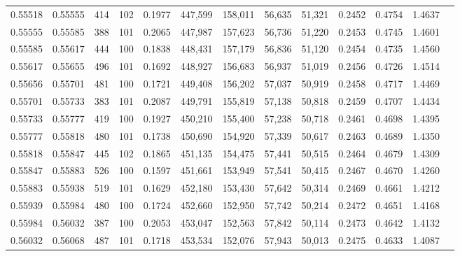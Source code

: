 \begin{tabular}{rrrrrrrrrrrrr}
0.55518 & 0.55555 &   414 & 102 &                                     0.1977 & 447,599 & 158,011 &  56,635 &  51,321 & 0.2452 & 0.4754 & 1.4637 \\
0.55555 & 0.55585 &   388 & 101 &                                     0.2065 & 447,987 & 157,623 &  56,736 &  51,220 & 0.2453 & 0.4745 & 1.4601 \\
0.55585 & 0.55617 &   444 & 100 &                                     0.1838 & 448,431 & 157,179 &  56,836 &  51,120 & 0.2454 & 0.4735 & 1.4560 \\
0.55617 & 0.55655 &   496 & 101 &                                     0.1692 & 448,927 & 156,683 &  56,937 &  51,019 & 0.2456 & 0.4726 & 1.4514 \\
0.55656 & 0.55701 &   481 & 100 &                                     0.1721 & 449,408 & 156,202 &  57,037 &  50,919 & 0.2458 & 0.4717 & 1.4469 \\
0.55701 & 0.55733 &   383 & 101 &                                     0.2087 & 449,791 & 155,819 &  57,138 &  50,818 & 0.2459 & 0.4707 & 1.4434 \\
0.55733 & 0.55777 &   419 & 100 &                                     0.1927 & 450,210 & 155,400 &  57,238 &  50,718 & 0.2461 & 0.4698 & 1.4395 \\
0.55777 & 0.55818 &   480 & 101 &                                     0.1738 & 450,690 & 154,920 &  57,339 &  50,617 & 0.2463 & 0.4689 & 1.4350 \\
0.55818 & 0.55847 &   445 & 102 &                                     0.1865 & 451,135 & 154,475 &  57,441 &  50,515 & 0.2464 & 0.4679 & 1.4309 \\
0.55847 & 0.55883 &   526 & 100 &                                     0.1597 & 451,661 & 153,949 &  57,541 &  50,415 & 0.2467 & 0.4670 & 1.4260 \\
0.55883 & 0.55938 &   519 & 101 &                                     0.1629 & 452,180 & 153,430 &  57,642 &  50,314 & 0.2469 & 0.4661 & 1.4212 \\
0.55939 & 0.55984 &   480 & 100 &                                     0.1724 & 452,660 & 152,950 &  57,742 &  50,214 & 0.2472 & 0.4651 & 1.4168 \\
0.55984 & 0.56032 &   387 & 100 &                                     0.2053 & 453,047 & 152,563 &  57,842 &  50,114 & 0.2473 & 0.4642 & 1.4132 \\
0.56032 & 0.56068 &   487 & 101 &                                     0.1718 & 453,534 & 152,076 &  57,943 &  50,013 & 0.2475 & 0.4633 & 1.4087 \\

\end{tabular}
